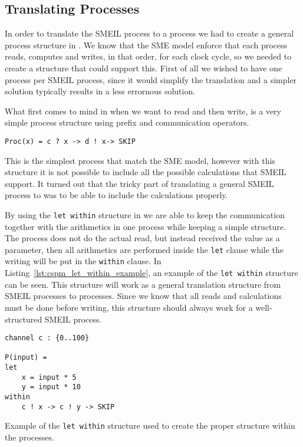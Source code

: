 \subsection{Translating Processes}
In order to translate the SMEIL process to a \cspm{} process we had to create a general process structure in \cspm{}. We know that the SME model enforce that each process reads, computes and writes, in that order, for each clock cycle, so we needed to create a \cspm{} structure that could support this. First of all we wished to have one \cspm{} process per SMEIL process, since it would simplify the translation and a simpler solution typically results in a less errornous solution.

What first comes to mind in \cspm{} when we want to read and then write, is a very simple process structure using prefix and communication operators.
\begin{verbatim}
Proc(x) = c ? x -> d ! x-> SKIP
\end{verbatim}
This is the simplest \cspm{} process that match the SME model, however with this structure it is not possible to include all the possible calculations that SMEIL support. It turned out that the tricky part of translating a general SMEIL process to \cspm{} was to be able to include the calculations properly.

By using the \texttt{let within} structure in \cspm{} we are able to keep the communication together with the arithmetics in one \cspm{} process while keeping a simple structure. The \cspm{} process does not do the actual read, but instead received the value as a parameter, then all arithmetics are performed inside the \texttt{let} clause while the writing will be put in the \texttt{within} clause.
In Listing~\ref{lst:cspm_let_within_example}, an example of the \texttt{let within} structure can be seen. This structure will work as a general translation structure from SMEIL processes to \cspm{} processes. Since we know that all reads and calculations must be done before writing, this structure should always work for a well-structured SMEIL process.

\begin{listing}
\begin{verbatim}
channel c : {0..100}

P(input) =
let
    x = input * 5
    y = input * 10
within
    c ! x -> c ! y -> SKIP
\end{verbatim}
\caption{Example of the \texttt{let within} structure used to create the proper structure within the \cspm{} processes.}
\label{lst:cspm_let_within_example}
\end{listing}

